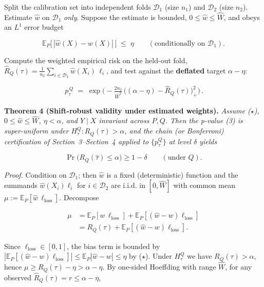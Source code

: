 \documentclass{ieeeaccess}
\begin{document}
Split the calibration set into independent folds $\mathcal D_1$ (size $n_1$) and $\mathcal D_2$ (size $n_2$). Estimate $\hat w$ on $\mathcal D_1$ \emph{only}. Suppose the estimate is bounded, $0\le\hat w\le\hat W$, and obeys an $L^1$ error budget

\begin{equation}
\mathbb E_P\big[\,|\hat w(X)-w(X)|\,\big]\;\le\;\eta
\qquad(\text{conditionally on }\mathcal D_1).
\tag{$\star$}
\end{equation}

Compute the weighted empirical risk on the held-out fold, $\hat R_Q(\tau)=\frac1{n_2}\sum_{i\in\mathcal D_2}\hat w(X_i)\,\ell_i$, and test against the \textbf{deflated} target $\alpha-\eta$:

\begin{equation}
\boxed{\,p^{\,Q}_\tau \;=\; \exp\!\Big(-\tfrac{2 n_2}{\hat W^2}\,\big((\alpha-\eta)-\hat R_Q(\tau)\big)_+^2\Big)\,}.
\tag{3}
\end{equation}

\textbf{Theorem 4 (Shift-robust validity under estimated weights).} \emph{Assume ($\star$), $0\le\hat w\le\hat W$, $\eta<\alpha$, and $Y\mid X$ invariant across $P,Q$. Then the p-value (3) is super-uniform under $H^Q_\tau:R_Q(\tau)>\alpha$, and the chain (or Bonferroni) certification of Section~3--Section~4 applied to $\{p^Q_\tau\}$ at level $\delta$ yields}

\[
\Pr\big(R_Q(\hat\tau)\le\alpha\big)\ge1-\delta\qquad(\text{under }Q).
\]

\emph{Proof.} Condition on $\mathcal D_1$; then $\hat w$ is a fixed (deterministic) function and the summands $\hat w(X_i)\ell_i$ for $i\in\mathcal D_2$ are i.i.d. in $[0,\hat W]$ with common mean $\mu:=\mathbb E_P[\hat w\,\ell_{\mathrm{loss}}]$. Decompose

\[
\begin{aligned}
\mu
&=\mathbb E_P[w\,\ell_{\mathrm{loss}}]
  +\mathbb E_P[(\hat w-w)\ell_{\mathrm{loss}}]\\
&=R_Q(\tau)+\mathbb E_P[(\hat w-w)\ell_{\mathrm{loss}}].
\end{aligned}
\]

Since $\ell_{\mathrm{loss}}\in[0,1]$, the bias term is bounded by $|\mathbb E_P[(\hat w-w)\ell_{\mathrm{loss}}]|\le\mathbb E_P|\hat w-w|\le\eta$ by ($\star$). Under $H^Q_\tau$ we have $R_Q(\tau)>\alpha$, hence $\mu\ge R_Q(\tau)-\eta>\alpha-\eta$. By one-sided Hoeffding with range $\hat W$, for any observed $\hat R_Q(\tau)=r\le\alpha-\eta$,
\end{document}
